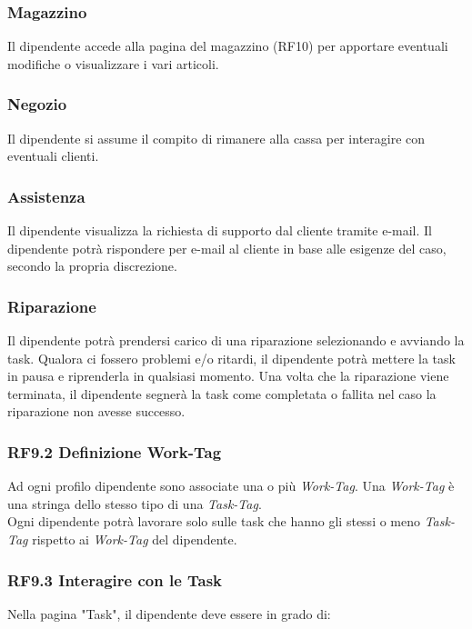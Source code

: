\documentclass{report}
\begin{document}
\subsubsection*{Magazzino} Il dipendente accede alla pagina del magazzino (RF10) per apportare eventuali modifiche o visualizzare i vari articoli.
	
\subsubsection*{Negozio} Il dipendente si assume il compito di rimanere alla cassa per interagire con eventuali clienti.
	
\subsubsection*{Assistenza} Il dipendente visualizza la richiesta di supporto dal cliente tramite e-mail. Il dipendente potrà rispondere per e-mail al cliente in base alle esigenze del caso, secondo la propria discrezione.
	
\subsubsection*{Riparazione} Il dipendente potrà prendersi carico di una riparazione selezionando e avviando la task. Qualora ci fossero problemi e/o ritardi, il dipendente potrà mettere la task in pausa e riprenderla in qualsiasi momento. Una volta che la riparazione viene terminata, il dipendente segnerà la task come completata o fallita nel caso la riparazione non avesse successo.

\subsubsection*{RF9.2 Definizione Work-Tag}
Ad ogni profilo dipendente sono associate una o più \textit{Work-Tag}. Una \textit{Work-Tag} è una stringa dello stesso tipo di una \textit{Task-Tag}.\\
Ogni dipendente potrà lavorare solo sulle task che hanno gli stessi o meno \textit{Task-Tag} rispetto ai \textit{Work-Tag} del dipendente.

\subsubsection*{RF9.3 Interagire con le Task}

Nella pagina "Task", il dipendente deve essere in grado di:
\end{document}

